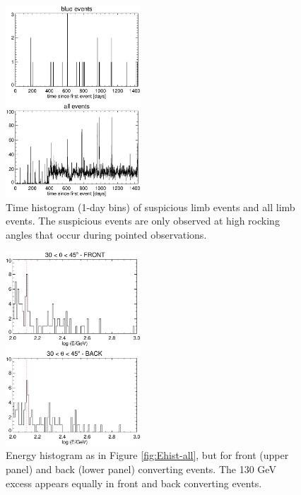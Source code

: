 \documentclass[aps,twocolumn,prd,superscriptaddress,showpacs,nofootinbib,fixfloat]{revtex4}
\begin{document}
\begin{figure}
\centering
\includegraphics[width=0.45\textwidth]{plots/timehist.ps}
\caption{Time histogram (1-day bins) of suspicious limb events and all limb
events.  The suspicious events are only observed at high rocking
angles that occur during pointed observations.
}
\label{fig:timehist}
\end{figure}

\begin{figure}
\centering
\includegraphics[width=0.45\textwidth]{plots/Ehist-frontback.ps}
\caption{Energy histogram as in Figure \ref{fig:Ehist-all}, but for front
  (upper panel) and back (lower panel) converting events.  The 130 GeV excess
  appears equally in front and back converting events. 
}
\label{fig:Ehist-frontback}
\end{figure}
\end{document}
